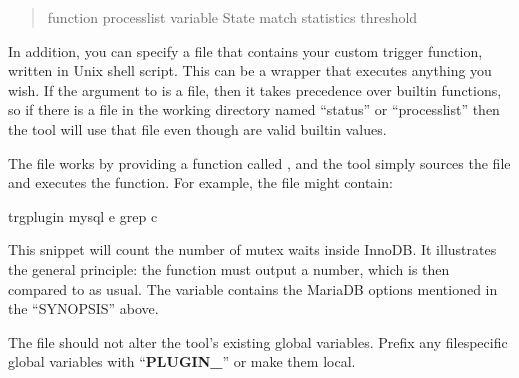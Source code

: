 \documentclass[letterpaper,10pt,english]{sphinxmanual}
\begin{document}
\begin{fulllineitems}
\begin{quote}
\begin{sphinxVerbatim}[commandchars=\\\{\}]
\PYGZhy{}\PYGZhy{}function processlist 
\PYGZhy{}\PYGZhy{}variable State       
\PYGZhy{}\PYGZhy{}match statistics     
\PYGZhy{}\PYGZhy{}threshold 
\end{sphinxVerbatim}
\end{quote}

In addition, you can specify a file that contains your custom trigger
function, written in Unix shell script.  This can be a wrapper that executes
anything you wish.  If the argument to {\hyperref[\detokenize{mariadb-stat:cmdoption-mariadb-stat-function}]{}} is a file, then it
takes precedence over built\sphinxhyphen{}in functions, so if there is a file in the working
directory named “status” or “processlist” then the tool will use that file
even though are valid built\sphinxhyphen{}in values.

The file works by providing a function called , and the tool
simply sources the file and executes the function.  For example, the file
might contain:

\begin{sphinxVerbatim}[commandchars=\\\{\}]
trg\PYGZus{}plugin 
   mysql  \PYGZhy{}e  
      grep \PYGZhy{}c 
\end{sphinxVerbatim}

This snippet will count the number of mutex waits inside InnoDB.  It
illustrates the general principle: the function must output a number, which is
then compared to {\hyperref[\detokenize{mariadb-stat:cmdoption-mariadb-stat-threshold}]{}} as usual.  The  variable
contains the MariaDB options mentioned in the “SYNOPSIS” above.

The file should not alter the tool’s existing global variables.  Prefix any
file\sphinxhyphen{}specific global variables with “{\color{red}\bfseries{}PLUGIN\_}” or make them local.

\end{fulllineitems}
\end{document}

